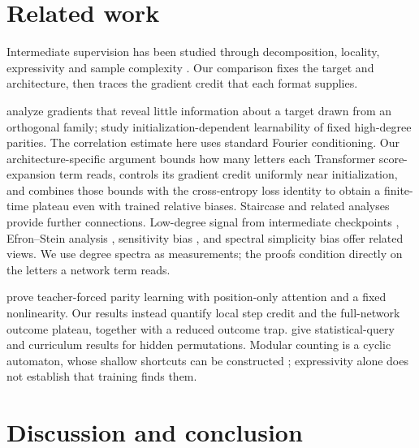 \section{Related work}
\label{sec:related}

Intermediate supervision has been studied through decomposition, locality, expressivity and
sample complexity \citep{nye2021scratchpads,wies2023subtask,prystawski2023think,abbe2024globality,
feng2023towards,merrill2024expressive,malach2023autoregressive,hanneke2026samplecomplexityautoregressivereasoning,wen2024sparse}.
Our comparison fixes the target and architecture, then traces the gradient credit that each format supplies.

\citet{shalevshwartz2017failures} analyze gradients that reveal little information
about a target drawn from an orthogonal family; \citet{abbe2025parities} study
initialization-dependent learnability of fixed high-degree parities.
The correlation estimate here uses standard Fourier conditioning. Our architecture-specific
argument bounds how many letters each Transformer score-expansion term reads, controls
its gradient credit uniformly near initialization, and combines those bounds with the
cross-entropy loss identity to obtain a finite-time plateau even with trained relative biases.
Staircase and related analyses
\citep{abbe2021staircase,abbe2022mergedstaircase,abbe2023sgd} provide further connections.
Low-degree signal from intermediate checkpoints \citep{panigrahi2025progressive}, Efron--Stein
analysis \citep{li2025noise}, sensitivity bias \citep{hahn2024sensitive}, and spectral simplicity
bias \citep{yang2019spectral} offer related views. We use degree spectra as measurements;
the proofs condition directly on the letters a network term reads.

\citet{kim2024parity} prove teacher-forced parity learning with position-only attention and a fixed
nonlinearity. Our results instead quantify local step credit and the full-network
outcome plateau, together with a reduced outcome trap. \citet{wang2025compositional} give statistical-query
and curriculum results for hidden permutations. Modular counting is a cyclic automaton,
whose shallow shortcuts can be constructed \citep{liu2023automata}; expressivity alone does
not establish that training finds them.

\section{Discussion and conclusion}
\label{sec:conclusion}
\label{sec:discussion}

